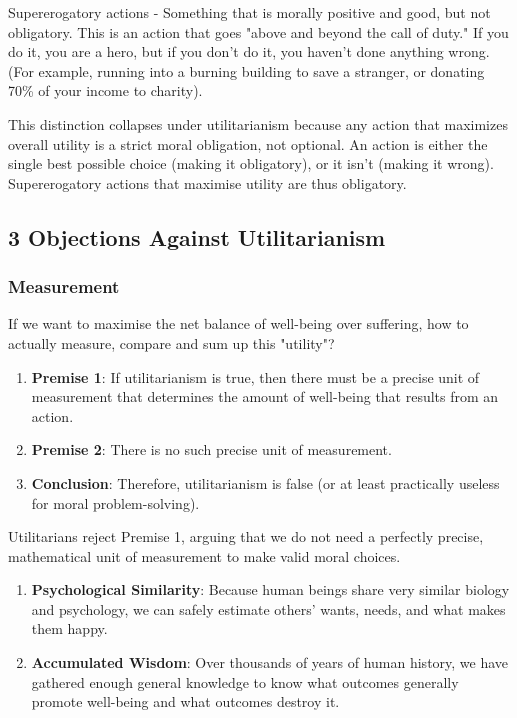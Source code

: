 \documentclass[12pt]{article}
\begin{document}
\noindent Supererogatory actions - Something that is morally positive and good, but not obligatory. This is an action that goes "above and beyond the call of duty." If you do it, you are a hero, but if you don't do it, you haven't done anything wrong. (For example, running into a burning building to save a stranger, or donating 70\% of your income to charity).

\noindent This distinction collapses under utilitarianism because any action that maximizes overall utility is a strict moral obligation, not optional.
An action is either the single best possible choice (making it obligatory), or it isn't (making it wrong).
Supererogatory actions that maximise utility are thus obligatory.

\subsection{3 Objections Against Utilitarianism}
\subsubsection{Measurement}
If we want to maximise the net balance of well-being over suffering,
how to actually measure, compare and sum up this "utility"?
\begin{enumerate}
    \item \textbf{Premise 1}: If utilitarianism is true, then there must be a precise unit of measurement that determines the amount of well-being that results from an action.
    \item \textbf{Premise 2}: There is no such precise unit of measurement.
    \item \textbf{Conclusion}: Therefore, utilitarianism is false (or at least practically useless for moral problem-solving).
\end{enumerate}
Utilitarians reject Premise 1, arguing that we do not need a perfectly precise, mathematical unit of measurement to make valid moral choices.
\begin{enumerate}
    \item \textbf{Psychological Similarity}: Because human beings share very similar biology and psychology, we can safely estimate others' wants, needs, and what makes them happy.
    \item \textbf{Accumulated Wisdom}: Over thousands of years of human history, we have gathered enough general knowledge to know what outcomes generally promote well-being and what outcomes destroy it.
\end{enumerate}
\end{document}
